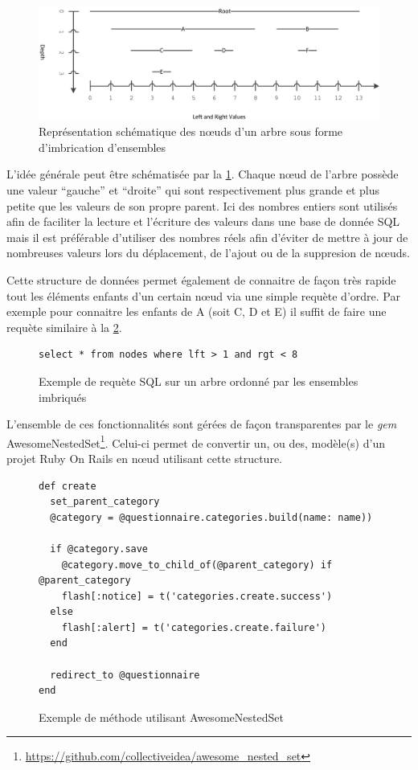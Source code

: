 \documentclass[12pt,a4paper]{book}
\begin{document}
\begin{figure}[htp]
\centering
\includegraphics[scale=.12]{img/nested1.png}
\caption{Représentation schématique des nœuds d'un arbre sous forme d'imbrication d'ensembles}
\label{img:nested1}
\end{figure}

L'idée générale peut être schématisée par la \cref{img:nested1}. Chaque nœud de l'arbre possède une valeur ``gauche'' et ``droite'' qui sont respectivement plus grande et plus petite que les valeurs de son propre parent. Ici des nombres entiers sont utilisés afin de faciliter la lecture et l'écriture des valeurs dans une base de donnée SQL mais il est préférable d'utiliser des nombres réels afin d'éviter de mettre à jour de nombreuses valeurs lors du déplacement, de l'ajout ou de la suppresion de nœuds.

Cette structure de données permet également de connaitre de façon très rapide tout les éléments enfants d'un certain nœud via une simple requète d'ordre. Par exemple pour connaitre les enfants de A (soit C, D et E) il suffit de faire une requète similaire à la \cref{fig.nestedsql}.

\begin{figure}[h]
\lstset{language=sql}
\begin{lstlisting}
select * from nodes where lft > 1 and rgt < 8
\end{lstlisting}
 \caption{Exemple de requète SQL sur un arbre ordonné par les ensembles imbriqués}
 \label{fig.nestedsql}
\end{figure}

L'ensemble de ces fonctionnalités sont gérées de façon transparentes par le \textit{gem} AwesomeNestedSet\footnote{\url{https://github.com/collectiveidea/awesome_nested_set}}. Celui-ci permet de convertir un, ou des, modèle(s) d'un projet Ruby On Rails en nœud utilisant cette structure.

\begin{figure}[h]
\lstset{language=ruby}
\begin{lstlisting}
def create
  set_parent_category
  @category = @questionnaire.categories.build(name: name))

  if @category.save
    @category.move_to_child_of(@parent_category) if @parent_category
    flash[:notice] = t('categories.create.success')
  else
    flash[:alert] = t('categories.create.failure')
  end

  redirect_to @questionnaire
end
\end{lstlisting}
 \caption{Exemple de méthode utilisant AwesomeNestedSet}
 \label{fig.nestedrail}
\end{figure}
\end{document}
